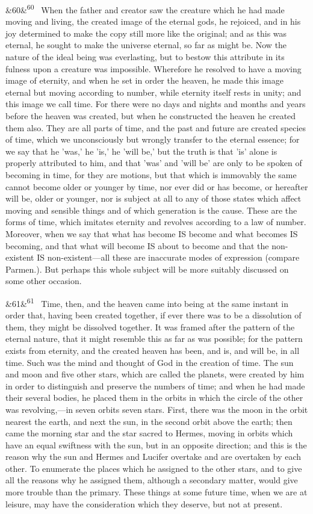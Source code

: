 \documentclass[12pt]{article}
\newcommand{\para}[1][]{\par\noindent\ifx&#1&\else\textsuperscript{\footnotesize #1}~\fi}
\begin{document}
\para[60] When the father and creator saw the creature which he had made moving and living, the created image of the eternal gods, he rejoiced, and in his joy determined to make the copy still more like the original; and as this was eternal, he sought to make the universe eternal, so far as might be. Now the nature of the ideal being was everlasting, but to bestow this attribute in its fulness upon a creature was impossible. Wherefore he resolved to have a moving image of eternity, and when he set in order the heaven, he made this image eternal but moving according to number, while eternity itself rests in unity; and this image we call time. For there were no days and nights and months and years before the heaven was created, but when he constructed the heaven he created them also. They are all parts of time, and the past and future are created species of time, which we unconsciously but wrongly transfer to the eternal essence; for we say that he 'was,' he 'is,' he 'will be,' but the truth is that 'is' alone is properly attributed to him, and that 'was' and 'will be' are only to be spoken of becoming in time, for they are motions, but that which is immovably the same cannot become older or younger by time, nor ever did or has become, or hereafter will be, older or younger, nor is subject at all to any of those states which affect moving and sensible things and of which generation is the cause. These are the forms of time, which imitates eternity and revolves according to a law of number. Moreover, when we say that what has become IS become and what becomes IS becoming, and that what will become IS about to become and that the non-existent IS non-existent---all these are inaccurate modes of expression (compare Parmen.). But perhaps this whole subject will be more suitably discussed on some other occasion.

\para[61] Time, then, and the heaven came into being at the same instant in order that, having been created together, if ever there was to be a dissolution of them, they might be dissolved together. It was framed after the pattern of the eternal nature, that it might resemble this as far as was possible; for the pattern exists from eternity, and the created heaven has been, and is, and will be, in all time. Such was the mind and thought of God in the creation of time. The sun and moon and five other stars, which are called the planets, were created by him in order to distinguish and preserve the numbers of time; and when he had made their several bodies, he placed them in the orbits in which the circle of the other was revolving,---in seven orbits seven stars. First, there was the moon in the orbit nearest the earth, and next the sun, in the second orbit above the earth; then came the morning star and the star sacred to Hermes, moving in orbits which have an equal swiftness with the sun, but in an opposite direction; and this is the reason why the sun and Hermes and Lucifer overtake and are overtaken by each other. To enumerate the places which he assigned to the other stars, and to give all the reasons why he assigned them, although a secondary matter, would give more trouble than the primary. These things at some future time, when we are at leisure, may have the consideration which they deserve, but not at present.
\end{document}
